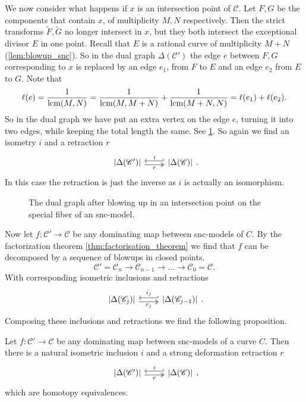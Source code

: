 \medskip

We now consider what happens if $x$ is an intersection point of $\mathscr C$. 
Let $F, G$ be the components that contain $x$, of multiplicity $M, N$ respectively. 
Then the strict transforms $\tilde F, \tilde G$ no longer intersect in $x$, but they both intersect the exceptional divisor $E$ in one point. 
Recall that $E$ is a rational curve of multiplicity $M + N$ (\cref{lem:blowup_snc}). 
So in the dual graph $\Delta(\mathscr C')$ the edge $e$ between $F, G$ corresponding to $x$ is replaced by an edge $e_1$, from $F$ to $E$ and an edge $e_2$ from $E$ to $G$. 
Note that \[
	\ell(e) = \frac{1}{\operatorname{lcm}(M, N)} = \frac{1}{\operatorname{lcm}(M, M + N)} + \frac{1}{\operatorname{lcm}(M+ N, N)} = \ell(e_1) + \ell(e_2)
.\]  
So in the dual graph we have put an extra vertex on the edge $e$, turning it into two edges, while keeping the total length the same.
See \cref{fig:blowup_intersection_points_skeleton}. 
So again we find an isometry $i$ and a retraction $r$
\[
\begin{tikzcd}
	{|\Delta(\mathscr C')|} \rar[hookleftarrow, shift left]{i} \rar[twoheadrightarrow, shift right, ']{r} & {|\Delta(\mathscr C)|} 
\end{tikzcd}
.\] 
In this case the retraction is just the inverse as $i$ is actually an isomorphism. 

\begin{figure}[ht]
    \centering
    \caption{The dual graph after blowing up in an intersection point on the special fiber of an snc-model. }
    \label{fig:blowup_intersection_points_skeleton}
\end{figure}

Now let $f:\mathscr C' \to \mathscr C$ be any dominating map between snc-models of $C$. 
By the factorization theorem \cref{thm:factorisation_theorem} we find that $f$ can be decomposed by a sequence of blowups in closed points. 
\[
\mathscr C' = \mathscr C_n \to \mathscr C_{n-1} \to \ldots \to \mathscr C_0 = \mathscr C
.\] 
With corresponding isometric inclusions and retractions 
\[
\begin{tikzcd}
	{|\Delta(\mathscr C_{j})|} \rar[hookleftarrow, shift left]{i_j} \rar[twoheadrightarrow, shift right, ']{r_j} & {|\Delta(\mathscr C_{j-1})|} 
\end{tikzcd}
.\] 
Composing these inclusions and retractions we find the following proposition.
\begin{proposition}\label{prop:inclusion_retraction_dual_graph}
	Let $f:\mathscr C' \to \mathscr C$ be any dominating map between snc-models of a curve $C$. 
	Then there is a natural isometric inclusion $i$ and a strong deformation retraction $r$
\[
\begin{tikzcd}
	{|\Delta(\mathscr C')|} \rar[hookleftarrow, shift left]{i} \rar[twoheadrightarrow, shift right, ']{r} & {|\Delta(\mathscr C)|} 
\end{tikzcd}
,\] 
	which are homotopy equivalences.
\end{proposition}

